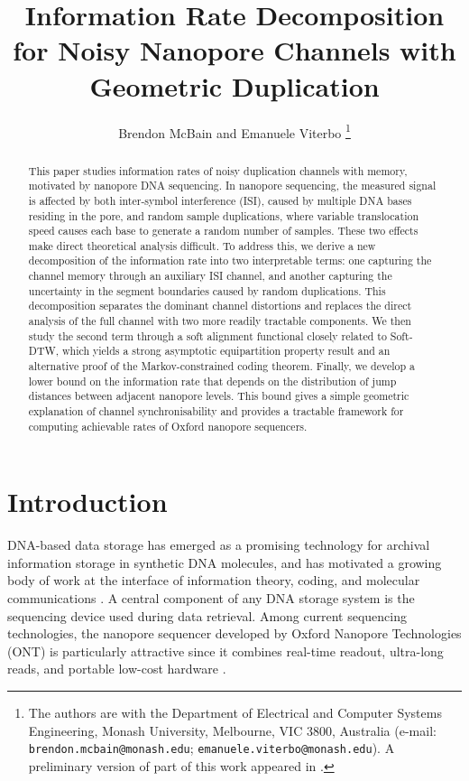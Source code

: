 \documentclass[onecolumn]{IEEEtran}
\title{Information Rate Decomposition for Noisy Nanopore Channels with Geometric Duplication}
\author{Brendon McBain and Emanuele Viterbo
\thanks{The authors are with the Department of Electrical and Computer Systems Engineering, Monash University, Melbourne, VIC 3800, Australia (e-mail: \texttt{brendon.mcbain@monash.edu}; \texttt{emanuele.viterbo@monash.edu}). A preliminary version of part of this work appeared in \cite{McBain2026}.}}
\theoremstyle{definition}
\begin{document}
\maketitle

\begin{abstract}
This paper studies information rates of noisy duplication channels with memory, motivated by nanopore DNA sequencing. In nanopore sequencing, the measured signal is affected by both inter-symbol interference (ISI), caused by multiple DNA bases residing in the pore, and random sample duplications, where variable translocation speed causes each base to generate a random number of samples. These two effects make direct theoretical analysis difficult. To address this, we derive a new decomposition of the information rate into two interpretable terms: one {capturing the channel memory through an auxiliary ISI channel}, and another {capturing} the uncertainty in the segment boundaries caused by random duplications. This decomposition separates the dominant channel distortions and replaces the direct analysis of the full channel with two more readily {tractable} components. We then study the second term through a soft alignment functional closely related to Soft-DTW, which {yields a strong asymptotic equipartition property result and an alternative proof of the Markov-constrained coding theorem}. Finally, we develop a lower bound on the information rate that depends on the distribution of jump distances between adjacent nanopore levels. This bound gives a simple geometric explanation of channel synchronisability and provides a tractable framework for computing achievable rates of Oxford nanopore sequencers.
\end{abstract}

\section{Introduction}


DNA-based data storage has emerged as a promising technology for archival
information storage in synthetic DNA molecules, and has motivated a growing
body of work at the interface of information theory, coding, and molecular
communications \cite{Sabary2024,Milenkovic2024}. A central component of any
DNA storage system is the sequencing device used during data retrieval. Among
current sequencing technologies, the nanopore sequencer developed by Oxford
Nanopore Technologies (ONT) is particularly attractive since it combines
real-time readout, ultra-long reads, and portable low-cost hardware
\cite{ONT}.
\end{document}
